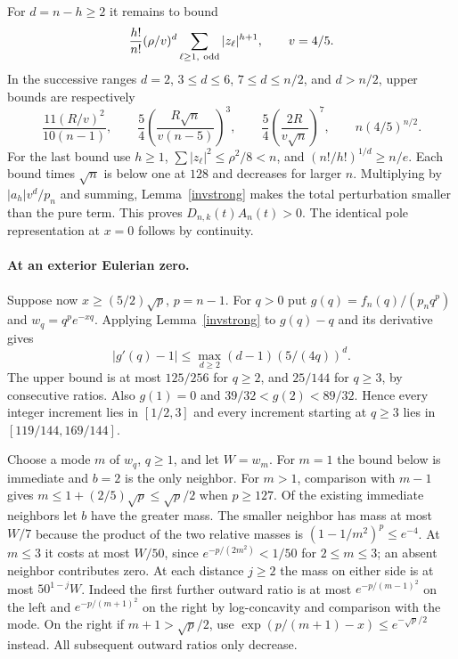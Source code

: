 For $d=n-h\ge2$ it remains to bound
\[
 \frac{h!}{n!}(\rho/v)^d\sum_{\ell\ge1,\ {\rm odd}}|z_\ell|^{h+1},
 \qquad v=4/5 .
\]
In the successive ranges $d=2$, $3\le d\le6$, $7\le d\le n/2$, and $d>n/2$, upper bounds are respectively
\[
 \frac{11(R/v)^2}{10(n-1)},\qquad
 \frac54\left(\frac{R\sqrt n}{v(n-5)}\right)^3,\qquad
 \frac54\left(\frac{2R}{v\sqrt n}\right)^7,\qquad
 n(4/5)^{n/2}.
\]
For the last bound use $h\ge1$, $\sum |z_\ell|^2\le\rho^2/8<n$, and $(n!/h!)^{1/d}\ge n/e$. Each bound times $\sqrt n$ is below one at $128$ and decreases for larger $n$. Multiplying by $|a_h|v^d/p_n$ and summing, Lemma~\ref{invstrong} makes the total perturbation smaller than the pure term. This proves $D_{n,k}(t)A_n(t)>0$. The identical pole representation at $x=0$ follows by continuity.

\paragraph{At an exterior Eulerian zero.}
Suppose now $x\ge(5/2)\sqrt{p}$, $p=n-1$. For $q>0$ put $g(q)=f_n(q)/(p_nq^p)$ and $w_q=q^p e^{-xq}$. Applying Lemma~\ref{invstrong} to $g(q)-q$ and its derivative gives
\[
 |g'(q)-1|\le\max_{d\ge2}(d-1)(5/(4q))^d .
\]
The upper bound is at most $125/256$ for $q\ge2$, and $25/144$ for $q\ge3$, by consecutive ratios. Also $g(1)=0$ and $39/32<g(2)<89/32$. Hence every integer increment lies in $[1/2,3]$ and every increment starting at $q\ge3$ lies in $[119/144,169/144]$.

Choose a mode $m$ of $w_q$, $q\ge1$, and let $W=w_m$. For $m=1$ the bound below is immediate and $b=2$ is the only neighbor. For $m>1$, comparison with $m-1$ gives $m\le1+(2/5)\sqrt p\le\sqrt p/2$ when $p\ge127$. Of the existing immediate neighbors let $b$ have the greater mass. The smaller neighbor has mass at most $W/7$ because the product of the two relative masses is $(1-1/m^2)^p\le e^{-4}$. At $m\le3$ it costs at most $W/50$, since $e^{-p/(2m^2)}<1/50$ for $2\le m\le3$; an absent neighbor contributes zero. At each distance $j\ge2$ the mass on either side is at most $50^{1-j}W$. Indeed the first further outward ratio is at most $e^{-p/(m-1)^2}$ on the left and $e^{-p/(m+1)^2}$ on the right by log-concavity and comparison with the mode. On the right if $m+1>\sqrt p/2$, use $\exp(p/(m+1)-x)\le e^{-\sqrt p/2}$ instead. All subsequent outward ratios only decrease.

